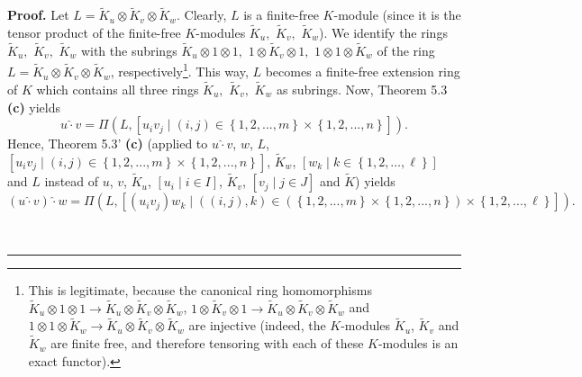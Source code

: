 \documentclass[numbers=enddot,12pt,final,onecolumn,notitlepage]{scrartcl}%
\newenvironment{proof}[1][Proof]{\noindent\textbf{#1.} }{\ \rule{0.5em}{0.5em}}
\begin{document}
\begin{proof}
Let $L=\widetilde{K}_{u}\otimes\widetilde{K}_{v}\otimes\widetilde{K}_{w}$.
Clearly, $L$ is a finite-free $K$-module (since it is the tensor product of
the finite-free $K$-modules $\widetilde{K}_{u},$ $\widetilde{K}_{v},$
$\widetilde{K}_{w}$). We identify the rings $\widetilde{K}_{u},$
$\widetilde{K}_{v},$ $\widetilde{K}_{w}$ with the subrings $\widetilde{K}%
_{u}\otimes1\otimes1,$ $1\otimes\widetilde{K}_{v}\otimes1,$ $1\otimes
1\otimes\widetilde{K}_{w}$ of the ring $L=\widetilde{K}_{u}\otimes
\widetilde{K}_{v}\otimes\widetilde{K}_{w}$, respectively\footnote{This is
legitimate, because the canonical ring homomorphisms $\widetilde{K}_{u}%
\otimes1\otimes1\rightarrow\widetilde{K}_{u}\otimes\widetilde{K}_{v}%
\otimes\widetilde{K}_{w}$, $1\otimes\widetilde{K}_{v}\otimes1\rightarrow
\widetilde{K}_{u}\otimes\widetilde{K}_{v}\otimes\widetilde{K}_{w}$ and
$1\otimes1\otimes\widetilde{K}_{w}\rightarrow\widetilde{K}_{u}\otimes
\widetilde{K}_{v}\otimes\widetilde{K}_{w}$ are injective (indeed, the
$K$-modules $\widetilde{K}_{u}$, $\widetilde{K}_{v}$ and $\widetilde{K}_{w}$
are finite free, and therefore tensoring with each of these $K$-modules is an
exact functor).}. This way, $L$ becomes a finite-free extension ring of $K$
which contains all three rings $\widetilde{K}_{u},$ $\widetilde{K}_{v},$
$\widetilde{K}_{w}$ as subrings. Now, Theorem 5.3 \textbf{(c)} yields%
\[
u\widehat{\cdot}v=\Pi\left(  L,\left[  u_{i}v_{j}\mid\left(  i,j\right)
\in\left\{  1,2,...,m\right\}  \times\left\{  1,2,...,n\right\}  \right]
\right)  .
\]
Hence, Theorem 5.3' \textbf{(c)} (applied to $u\widehat{\cdot}v$, $w$, $L$,
$\left[  u_{i}v_{j}\mid\left(  i,j\right)  \in\left\{  1,2,...,m\right\}
\times\left\{  1,2,...,n\right\}  \right]  $, $\widetilde{K}_{w}$, $\left[
w_{k}\mid k\in\left\{  1,2,\ldots,\ell\right\}  \right]  $ and $L$ instead of
$u$, $v$, $\widetilde{K}_{u}$, $\left[  u_{i}\mid i\in I\right]  $,
$\widetilde{K}_{v}$, $\left[  v_{j}\mid j\in J\right]  $ and $\widetilde{K}$)
yields
\[
\left(  u\widehat{\cdot}v\right)  \widehat{\cdot}w=\Pi\left(  L,\left[
\left(  u_{i}v_{j}\right)  w_{k}\mid\left(  \left(  i,j\right)  ,k\right)
\in\left(  \left\{  1,2,...,m\right\}  \times\left\{  1,2,...,n\right\}
\right)  \times\left\{  1,2,...,\ell\right\}  \right]  \right)  .
\]



\end{proof}
\end{document}
